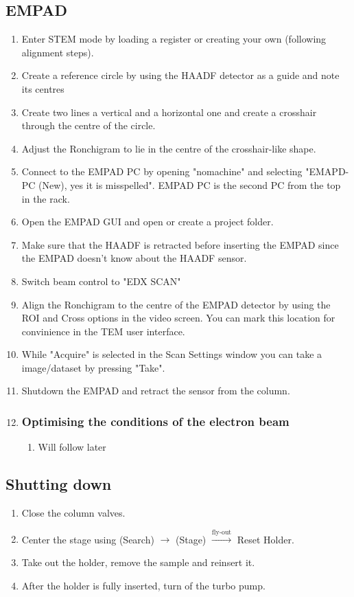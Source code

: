 \documentclass[a4paper]{scrartcl}
\begin{document}
\subsection*{EMPAD}
\begin{enumerate}
	\item Enter STEM mode by loading a register or creating your own (following alignment steps).
	\item Create a reference circle by using the HAADF detector as a guide and note its centres
	\item Create two lines a vertical and a horizontal one and create a crosshair through the centre of the circle.
	\item Adjust the Ronchigram to lie in the centre of the crosshair-like shape.
	\item Connect to the EMPAD PC by opening "nomachine" and selecting "EMAPD-PC (New), yes it is misspelled". EMPAD PC is the second PC from the top in the rack.
	\item Open the EMPAD GUI and open or create a project folder.
	\item Make sure that the HAADF is retracted before inserting the EMPAD since the EMPAD doesn't know about the HAADF sensor.
	\item Switch beam control to "EDX SCAN"
	\item Align the Ronchigram to the centre of the EMPAD detector by using the ROI and Cross options in the video screen. You can mark this location for convinience in the TEM user interface.
	\item While "Acquire" is selected in the Scan Settings window you can take a image/dataset by pressing "Take".
	\item Shutdown the EMPAD and retract the sensor from the column.
	\item {\subsubsection*{Optimising the conditions of the electron beam}
	      \begin{enumerate}
		      \item Will follow later
	      \end{enumerate}}
\end{enumerate}

\subsection*{Shutting down}
\begin{enumerate}
	\item Close the column valves.
	\item Center the stage using (Search) $\rightarrow$ (Stage) $\xrightarrow{\text{fly-out}}$ Reset Holder.
	\item Take out the holder, remove the sample and reinsert it.
	\item After the holder is fully inserted, turn of the turbo pump.
\end{enumerate}
\end{document}
